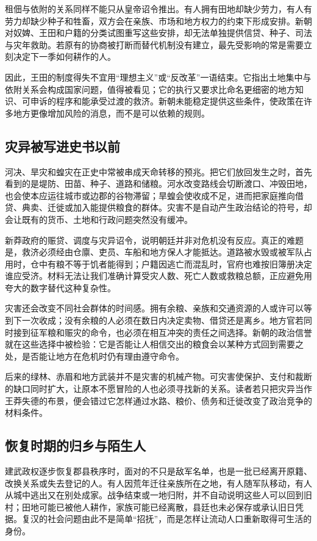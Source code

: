租佃与依附的关系同样不能只从皇帝诏令推出。有人拥有田地却缺少劳力，有人有劳力却缺少种子和牲畜，双方会在亲族、市场和地方权力的约束下形成安排。新朝对奴婢、王田和户籍的分类试图重写这些安排，却无法单独提供信贷、种子、司法与灾年救助。若原有的协商被打断而替代机制没有建立，最先受影响的常是需要立刻决定下一季如何耕作的人。

因此，王田的制度得失不宜用“理想主义”或“反改革”一语结束。它指出土地集中与依附关系会构成国家问题，值得被看见；它的执行又要求比命名更细密的地方知识、可申诉的程序和能承受过渡的救济。新朝未能稳定提供这些条件，使政策在许多地方更像增加风险的消息，而不是可以依赖的规则。

\subsection{灾异被写进史书以前}

河决、旱灾和蝗灾在正史中常被串成天命转移的预兆。把它们放回发生之时，首先看到的是堤防、田苗、种子、道路和储粮。河水改变路线会切断渡口、冲毁田地，也会使本应运往城市或边郡的谷物滞留；旱蝗会使收成不足，进而把家庭推向借贷、典卖、迁徙或加入能提供粮食的群体。灾害不是自动产生政治结论的符号，却会让既有的货币、土地和行政问题突然没有缓冲。

新莽政府的赈贷、调度与灾异诏令，说明朝廷并非对危机没有反应。真正的难题是，救济必须经由仓廪、吏员、车船和地方保人才能抵达。道路被水毁或被军队占用时，仓中有粮不等于饥者能得到；户籍因逃亡而混乱时，官府也难按旧簿册决定谁应受济。材料无法让我们准确计算受灾人数、死亡人数或救粮总额，正应避免用夸大的数字替代这种复杂性。

灾害还会改变不同社会群体的时间感。拥有余粮、亲族和交通资源的人或许可以等到下一次收成；没有余粮的人必须在数日内决定卖物、借贷还是离乡。地方官若同时接到征军粮和赈灾的命令，也必须在相互冲突的责任之间选择。新朝的政治信誉就在这些选择中被检验：它是否能让人相信交出的粮食会以某种方式回到需要之处，是否能让地方在危机时仍有理由遵守命令。

后来的绿林、赤眉和地方武装并不是灾害的机械产物。可灾害使保护、支付和裁断的缺口同时扩大，让原本不愿冒险的人也必须寻找新的关系。读者若只把灾异当作王莽失德的布景，便会错过它怎样通过水路、粮价、债务和迁徙改变了政治竞争的材料条件。

\subsection{恢复时期的归乡与陌生人}

建武政权逐步恢复郡县秩序时，面对的不只是敌军名单，也是一批已经离开原籍、改换关系或失去登记的人。有人因荒年迁往亲族所在之地，有人随军队移动，有人从城中逃出又在别处成家。战争结束或一地归附，并不自动说明这些人可以回到旧村；田地可能已被他人耕作，家族可能已经离散，县廷也未必保存或承认旧日凭据。复汉的社会问题由此不是简单“招抚”，而是怎样让流动人口重新取得可生活的身份。

